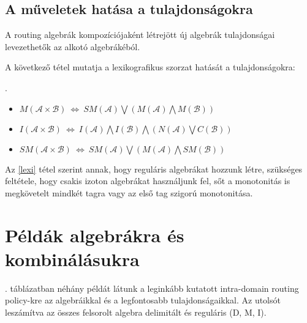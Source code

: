     \subsection{A műveletek hatása a tulajdonságokra}\label{section_algebramuveletek_tulajdonsagok}
    A routing algebrák kompozíciójaként létrejött új algebrák tulajdonságai levezethetők az alkotó algebrákéból.

    A következő tétel mutatja a lexikografikus szorzat hatását a tulajdonságokra:
    \begin{theorem}\label{eq:lexi}
      .
      \begin{itemize}
      \item $M(\mathcal{A} \times \mathcal{B})~\Leftrightarrow~ SM(\mathcal{A}) \bigvee (M(\mathcal{A}) \bigwedge M(\mathcal{B}))$
      \item $I(\mathcal{A} \times \mathcal{B})~\Leftrightarrow~ I(\mathcal{A}) \bigwedge I(\mathcal{B}) \bigwedge (N(\mathcal{A}) \bigvee C(\mathcal{B}))$
      \item $SM(\mathcal{A} \times \mathcal{B})~\Leftrightarrow~ SM(\mathcal{A}) \bigvee (M(\mathcal{A}) \bigwedge SM(\mathcal{B}))$\\
      \end{itemize}
    \end{theorem}

    Az \eqref{lexi} tétel szerint annak, hogy reguláris algebrákat hozzunk létre, szükséges feltétele, hogy csakis izoton algebrákat használjunk fel, sőt a monotonitás is megkövetelt mindkét tagra vagy az első tag szigorú monotonitása.

  \section{Példák algebrákra és kombinálásukra}\label{section_algebrapeldak}
  . táblázatban néhány példát látunk a leginkább kutatott intra-domain routing policy-kre az algebráikkal és a legfontosabb tulajdonságaikkal. Az utolsót leszámítva az összes felsorolt algebra delimitált és reguláris (D, M, I).

